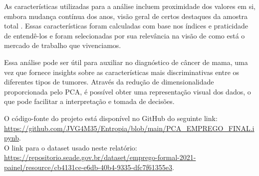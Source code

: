 \documentclass{article}
\begin{document}
As características utilizadas para a análise incluem proximidade dos valores em si, embora mudança contínua dos anos, visão geral de certos destaques da amostra total . Essas características foram calculadas com base nos índices e praticidade de entendê-los e foram selecionadas por sua relevância na visão de como está o mercado de trabalho que vivenciamos.

Essa análise pode ser útil para auxiliar no diagnóstico de câncer de mama, uma vez que fornece insights sobre as características mais discriminativas entre os diferentes tipos de tumores. Através da redução de dimensionalidade proporcionada pelo PCA, é possível obter uma representação visual dos dados, o que pode facilitar a interpretação e tomada de decisões.



\pagebreak




O código-fonte do projeto está disponível no GitHub do seguinte link:\\ \url{https://github.com/JVG4M35/Entropia/blob/main/PCA\_EMPREGO\_FINAL.ipynb}.\\
O link para o dataset usado neste relatório:\\ \url{https://repositorio.seade.gov.br/dataset/emprego-formal-2021-painel/resource/cb4131ce-e6db-40b4-9335-dfc7f61355e3}.
\end{document}
